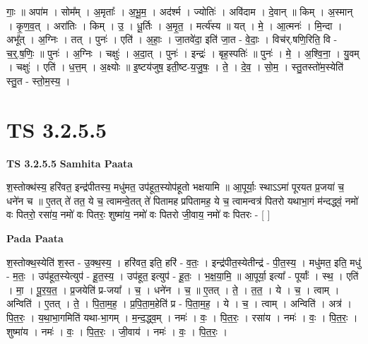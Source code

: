 \documentclass[17pt]{extarticle}
\begin{document}
गाः॒ ॥ अपा॑म । सोम᳚म् । अ॒मृताः᳚ । अ॒भू॒म॒ । अद॑र्श्म । ज्योतिः॑ । अवि॑दाम । दे॒वान् ॥ किम् । अ॒स्मान् । कृ॒ण॒व॒त् । अरा॑तिः । किम् । उ॒ । धू॒र्तिः । अ॒मृ॒त॒ । मर्त्य॑स्य ॥ यत् । मे॒ । आ॒त्मनः॑ । मि॒न्दा । अभू᳚त् । अ॒ग्निः । तत् । पुनः॑ । एति॑ । अ॒हाः॒ । जा॒तवे॑दा॒ इति॑ जा॒त - वे॒दाः॒ । विच॑र्.षणि॒रिति॒ वि - च॒र्॒.ष॒णिः॒ ॥ पुनः॑ । अ॒ग्निः । चक्षुः॑ । अ॒दा॒त् । पुनः॑ । इन्द्रः॑ । बृह॒स्पतिः॑ ॥ पुनः॑ । मे॒ । अ॒श्वि॒ना॒ । यु॒वम् । चक्षुः॑ । एति॑ । ध॒त्त॒म् । अ॒क्ष्योः ॥ इ॒ष्टय॑जुष॒ इती॒ष्ट-य॒जु॒षः॒ । ते॒ । दे॒व॒ । सो॒म॒ । स्तु॒तस्तो॑म॒स्येति॑ स्तु॒त - स्तो॒म॒स्य॒ ।  \newline





\section{ TS 3.2.5.5 }

\textbf{TS 3.2.5.5 } \newline
\textbf{Samhita Paata} \newline

श॒स्तोक्थ॑स्य॒ हरि॑वत॒ इन्द्र॑पीतस्य॒ मधु॑मत॒ उप॑हूत॒स्योप॑हूतो भक्षयामि ॥ आ॒पूर्याः॒ स्थाऽऽमा॑ पूरयत प्र॒जया॑ च॒ धने॑न च ॥ ए॒तत् ते॑ तत॒ ये च॒ त्वामन्वे॒तत् ते॑ पितामह प्रपितामह॒ ये च॒ त्वामन्वत्र॑ पितरो यथाभा॒गं म॑न्दद्ध्वं॒ नमो॑ वः पितरो॒ रसा॑य॒ नमो॑ वः पितरः॒ शुष्मा॑य॒ नमो॑ वः पितरो जी॒वाय॒ नमो॑ वः पितरः - [  ] \newline

\textbf{Pada Paata} \newline

श॒स्तोक्थ॒स्येति॑ श॒स्त - उ॒क्थ॒स्य॒ । हरि॑वत॒ इति॒ हरि॑ - व॒तः॒ । इन्द्र॑पीत॒स्येतीन्द्र॑ - पी॒त॒स्य॒ । मधु॑मत॒ इति॒ मधु॑ - म॒तः॒ । उप॑हूत॒स्येत्युप॑ - हू॒त॒स्य॒ । उप॑हूत॒ इत्युप॑ - हू॒तः॒ । भ॒क्ष॒या॒मि॒ ॥ आ॒पूर्या॒ इत्या᳚ - पूर्याः᳚ । स्थ॒ । एति॑ । मा॒ । पू॒र॒य॒त॒ । प्र॒जयेति॑ प्र-जया᳚ । च॒ । धने॑न । च॒ ॥ ए॒तत् । ते॒ । त॒त॒ । ये । च॒ । त्वाम् । अन्विति॑ । ए॒तत् । ते॒ । पि॒ता॒म॒ह॒ । प्र॒पि॒ता॒म॒हेति॑ प्र - पि॒ता॒म॒ह॒ । ये । च॒ । त्वाम् । अन्विति॑ । अत्र॑ । पि॒त॒रः॒ । य॒था॒भा॒गमिति॑ यथा-भा॒गम् । म॒न्द॒द्ध्व॒म् । नमः॑ । वः॒ । पि॒त॒रः॒ । रसा॑य । नमः॑ । वः॒ । पि॒त॒रः॒ । शुष्मा॑य । नमः॑ । वः॒ । पि॒त॒रः॒ । जी॒वाय॑ । नमः॑ । वः॒ । पि॒त॒रः॒ ।  \newline




\end{document}
